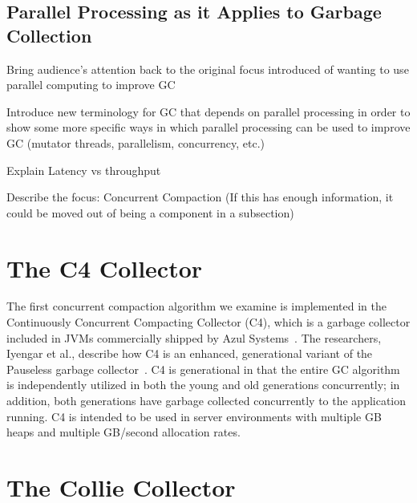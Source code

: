 \documentclass{sig-alternate}
\begin{document}
\subsection{Parallel Processing as it Applies to Garbage Collection}
\label{sec:parallelProcessingGarbageCollection}

Bring audience's attention back to the original focus introduced 
of wanting to use parallel computing to improve GC

Introduce new terminology for GC that depends on parallel processing 
in order to show some more specific ways in which parallel processing 
can be used to improve GC (mutator threads, parallelism, concurrency, etc.)

Explain Latency vs throughput

Describe the focus: Concurrent Compaction (If this has enough information, 
it could be moved out of being a component in a subsection)


\section{The C4 Collector}
\label{sec:c4}

The first concurrent compaction algorithm we examine is implemented in the 
Continuously Concurrent Compacting Collector (C4), which is a garbage collector 
included in JVMs commercially shipped by Azul Systems~\cite{Tene:C4}. The 
researchers, Iyengar et al., describe how C4 is an enhanced, generational variant
of the Pauseless garbage collector~\cite{Click:Pauseless}. C4 is generational in 
that the entire GC algorithm is independently utilized in both the young and old generations 
concurrently; in addition, both generations have garbage collected concurrently 
to the application running. 
C4 is intended to be used in server environments with multiple GB heaps and 
multiple GB/second allocation rates.


\section{The Collie Collector}
\label{sec:collie}

\end{document}
